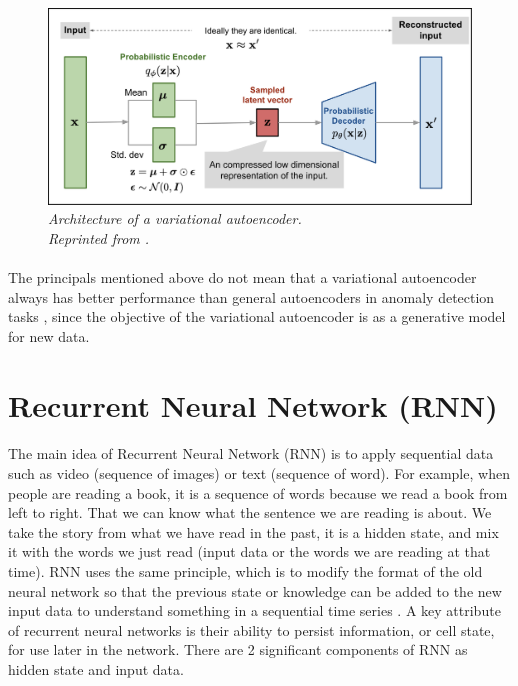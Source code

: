 \begin{figure}[H]
  \centering
  \caption[Architecture of a variational autoencoder.]{\emph{Architecture of a variational autoencoder. \\
  Reprinted from \citeauthor{weng_2018} \citeyear{weng_2018}.}}\label{fig:VAE}
  \includegraphics[scale = 0.15]{figures/VAE.jpg}  
\end{figure}

\paragraph{}
The principals mentioned above do not mean that a variational autoencoder always has better performance than general autoencoders in anomaly detection tasks \cite{agmon_2021}, since the objective of the variational autoencoder is as a generative model for new data.


\section{Recurrent Neural Network (RNN)}
\paragraph{}
The main idea of Recurrent Neural Network (RNN) is to apply sequential data such as video (sequence of images) or text (sequence of word). For example, when people are reading a book, it is a sequence of words because we read a book from left to right. That we can know what the sentence we are reading is about. We take the story from what we have read in the past, it is a hidden state, and mix it with the words we just read (input data or the words we are reading at that time). RNN uses the same principle, which is to modify the format of the old neural network so that the previous state or knowledge can be added to the new input data to understand something in a sequential time series \cite{donges_2019}. A key attribute of recurrent neural networks is their ability to persist information, or cell state, for use later in the network. There are 2 significant components of RNN as hidden state and input data.


